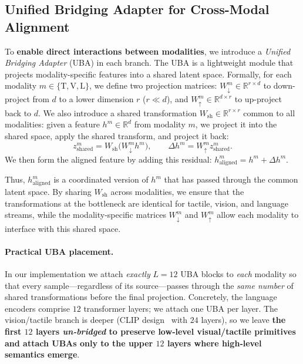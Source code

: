 \documentclass[letterpaper]{article} %
\theoremstyle{definition}                %
\theoremstyle{plain}                     %
\theoremstyle{remark}                    %
\begin{document}
\subsection{Unified Bridging Adapter for Cross-Modal Alignment}
To \textbf{enable direct interactions between modalities}, we introduce a \emph{Unified Bridging Adapter} (UBA) in each branch. The UBA is a lightweight module that projects modality-specific features into a shared latent space. Formally, for each modality $m\in\{\mathrm{T},\mathrm{V},\mathrm{L}\}$, we define two projection matrices: $W^m_{\downarrow}\in\mathbb{R}^{r\times d}$ to down-project from $d$ to a lower dimension $r$ ($r\ll d$), and $W^m_{\uparrow}\in\mathbb{R}^{d\times r}$ to up-project back to $d$. We also introduce a shared transformation $W_{\mathrm{sh}}\in\mathbb{R}^{r\times r}$ common to all modalities: given a feature $h^m\in\mathbb{R}^d$ from modality $m$, we project it into the shared space, apply the shared transform, and project it back:
\begin{equation}
z^m_{\mathrm{shared}} = W_{\mathrm{sh}}\bigl(W^m_{\downarrow}h^m\bigr), 
\qquad
\Delta h^m = W^m_{\uparrow} z^m_{\mathrm{shared}}.
\end{equation}
We then form the aligned feature by adding this residual: $h^m_{\mathrm{aligned}} = h^m + \Delta h^m$.

Thus, $h^m_{\mathrm{aligned}}$ is a coordinated version of $h^m$ that has passed through the common latent space. By sharing $W_{\mathrm{sh}}$ across modalities, we ensure that the transformations at the bottleneck are identical for tactile, vision, and language streams, while the modality-specific matrices $W^m_{\downarrow}$ and $W^m_{\uparrow}$ allow each modality to interface with this shared space.


\paragraph{Practical UBA placement.} 
In our implementation we attach \emph{exactly} $L\!=\!12$ UBA blocks to \emph{each} modality so that every sample—regardless of its source—passes through the \textit{same number} of shared transformations before the final projection.  
Concretely, the language encoders comprise $12$ transformer layers; we attach one UBA per layer.  
The vision/tactile branch is deeper (CLIP design~\cite{cherti2023reproducible} with $24$ layers), so we leave \textbf{the first $12$ layers \emph{un‐bridged} to preserve low‑level visual/tactile primitives and attach UBAs only to the upper $12$ layers where high‑level semantics emerge}.
\end{document}
